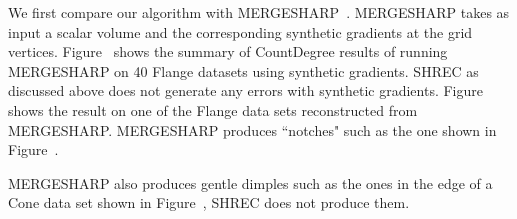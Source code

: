 We first compare our algorithm with
MERGESHARP~\cite{bw-cisec-13}. MERGESHARP takes as input a scalar
volume and the corresponding synthetic gradients at the grid
vertices. Figure~\protect{} shows the summary
of CountDegree results of running MERGESHARP on 40 Flange datasets
using synthetic gradients. SHREC as discussed above does not generate
any errors with synthetic
gradients. Figure~\protect{} shows the result
on one of the Flange data sets reconstructed from
MERGESHARP. MERGESHARP produces ``notches" such as the one shown in
Figure~\protect{}.

MERGESHARP also produces gentle dimples such as the ones in the edge of a Cone data set shown in Figure~\protect{}, SHREC does not produce them. 	


